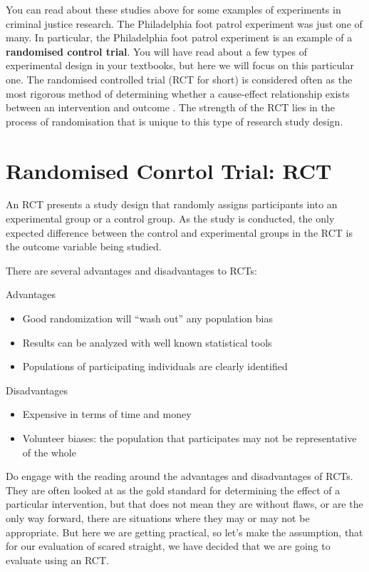 \documentclass[]{book}
\providecommand{\tightlist}{%
  \setlength{\itemsep}{0pt}\setlength{\parskip}{0pt}}
\theoremstyle{definition}
\theoremstyle{definition}
\theoremstyle{definition}
\theoremstyle{remark}
\begin{document}
You can read about these studies above for some examples of experiments
in criminal justice research. The Philadelphia foot patrol experiment
was just one of many. In particular, the Philadelphia foot patrol
experiment is an example of a \textbf{randomised control trial}. You
will have read about a few types of experimental design in your
textbooks, but here we will focus on this particular one. The randomised
controlled trial (RCT for short) is considered often as the most
rigorous method of determining whether a cause-effect relationship
exists between an intervention and outcome . The strength of the RCT
lies in the process of randomisation that is unique to this type of
research study design.

\hypertarget{randomised-conrtol-trial-rct}{%
\section{Randomised Conrtol Trial:
RCT}\label{randomised-conrtol-trial-rct}}

An RCT presents a study design that randomly assigns participants into
an experimental group or a control group. As the study is conducted, the
only expected difference between the control and experimental groups in
the RCT is the outcome variable being studied.

There are several advantages and disadvantages to RCTs:

Advantages

\begin{itemize}
\tightlist
\item
  Good randomization will ``wash out'' any population bias
\item
  Results can be analyzed with well known statistical tools
\item
  Populations of participating individuals are clearly identified
\end{itemize}

Disadvantages

\begin{itemize}
\tightlist
\item
  Expensive in terms of time and money
\item
  Volunteer biases: the population that participates may not be
  representative of the whole
\end{itemize}

Do engage with the reading around the advantages and disadvantages of
RCTs. They are often looked at as the gold standard for determining the
effect of a particular intervention, but that does not mean they are
without flaws, or are the only way forward, there are situations where
they may or may not be appropriate. But here we are getting practical,
so let's make the assumption, that for our evaluation of scared
straight, we have decided that we are going to evaluate using an RCT.
\end{document}
